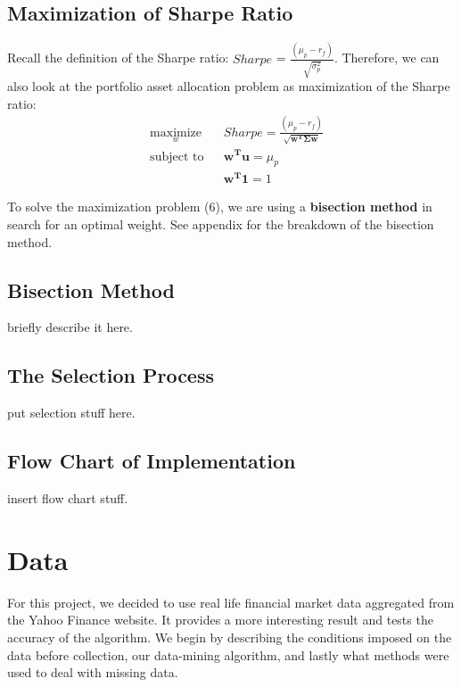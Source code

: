 \documentclass[12pt,titlepage,a4paper]{article}
\begin{document}
\subsection{Maximization of Sharpe Ratio}
Recall the definition of the Sharpe ratio: $Sharpe$ = $\frac{(\mu_p - r_f)}{\sqrt{\sigma_p^2}}$. Therefore, we can also look at the portfolio asset allocation problem as maximization of the Sharpe ratio: 
\begin{equation}
\begin{aligned}
& \underset{w}{\text{maximize}}
& & Sharpe = \frac{(\mu_p - r_f)}{\sqrt{\mathbf{w^T\Sigma w}}} \\
& \text{subject to}
& & \mathbf{w^Tu} = \mu_p \\
&&& \mathbf{w^T1}=1
\end{aligned}
\end{equation}

To solve the maximization problem (6), we are using a \textbf{bisection method} in search for an optimal weight. See appendix for the breakdown of the bisection method.  

\subsection{Bisection Method}
briefly describe it here.

\subsection{The Selection Process}
put selection stuff here.

\subsection{Flow Chart of Implementation}
insert flow chart stuff. 

\section{Data}
For this project, we decided to use real life financial market data aggregated from the Yahoo Finance website. It provides a more interesting result and tests the accuracy of the algorithm. We begin by describing the conditions imposed on the data before collection, our data-mining algorithm, and lastly what methods were used to deal with missing data.
\end{document}

